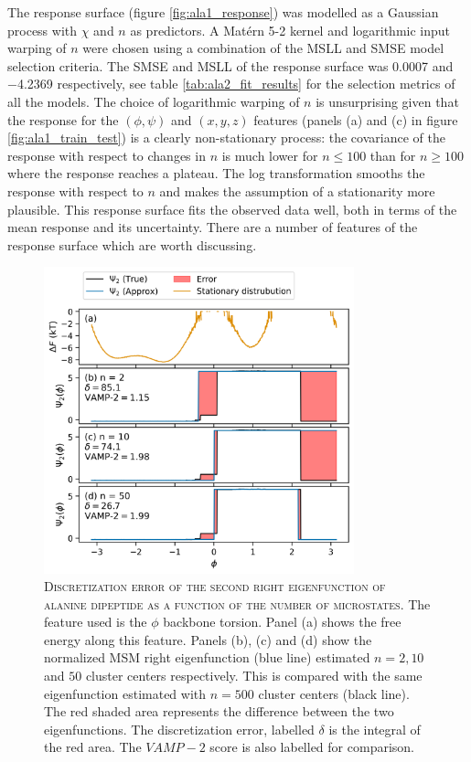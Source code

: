 The response surface (figure \ref{fig:ala1_response}) was modelled as a Gaussian process with $\chi$ and $n$ as predictors. A Mat\'{e}rn 5-2 kernel and logarithmic input warping of $n$ were chosen using a combination of the MSLL and SMSE model selection criteria. The SMSE and MSLL of the response surface was \num{0.0007} and  \num{-4.2369} respectively, see table \ref{tab:ala2_fit_results} for the selection metrics of all the models. The choice of logarithmic warping of $n$ is unsurprising given that the response for the $(\phi, \psi)$ and $(x,y,z)$ features (panels (a) and (c) in figure \ref{fig:ala1_train_test}) is a clearly non-stationary process: the covariance of the response with respect to changes in $n$ is much lower for $n\leq 100$ than for $n\geq 100$ where the response reaches a plateau. The log transformation smooths the response with respect to $n$ and makes the assumption of a stationarity more plausible.  This response surface fits the observed data well, both in terms of the mean response and its uncertainty. There are a number of features of the response surface which are worth discussing. 

\begin{figure}
    \centering
    \caption[Discretization error of the second right eigenfunction of alanine dipeptide as a function of the number of microstates]{\textsc{Discretization error of the second right eigenfunction of alanine dipeptide as a function of the number of microstates}. The feature used is the $\phi$ backbone torsion. Panel (a) shows the free energy along this feature. Panels (b), (c) and (d) show the normalized MSM right eigenfunction (blue line) estimated $n=2, 10$ and $50$ cluster centers respectively. This is compared with the same eigenfunction estimated with $n=500$ cluster centers (black line). The red shaded area represents the difference between the two eigenfunctions. The discretization error, labelled $\delta$ is the integral of the red area. The $VAMP-2$ score is also labelled for comparison.}
    \label{fig:ala1_evcompare}
    \includegraphics[width=0.8\textwidth]{chapters/msm_optimization/figures/ala1_ev_n_compare.png}
\end{figure}

